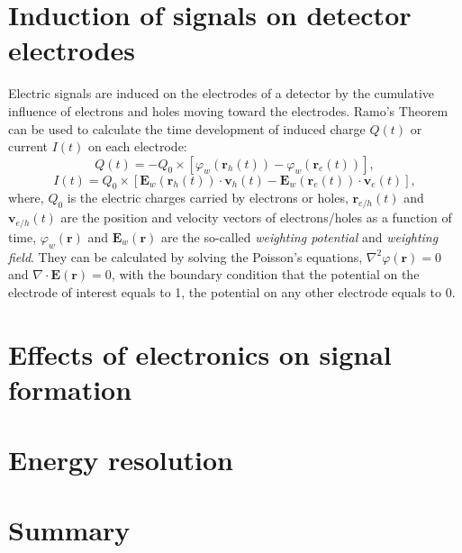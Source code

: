 \section{Induction of signals on detector electrodes}
\label{sec:det:lamo}
Electric signals are induced on the electrodes of a detector by the cumulative influence of electrons and holes moving toward the electrodes. Ramo's Theorem~\cite{Gat82, Rad88, He00} can be used to calculate the time development of induced charge $Q(t)$ or current $I(t)$ on each electrode:
\begin{equation} 
  \label{eq:det:ramoq}
  Q(t) = -Q_{0} \times [\varphi_{w}(\mathbf{r}_{h}(t)) - \varphi_{w}(\mathbf{r}_{e}(t))],
\end{equation}
\begin{equation} 
  \label{eq:det:ramoi}
  I(t) = Q_{0} \times [\mathbf{E}_{w}(\mathbf{r}_{h}(t)) \cdot \mathbf{v}_{h}(t) - \mathbf{E}_{w}(\mathbf{r}_{e}(t)) \cdot \mathbf{v}_{e}(t)],
\end{equation}
where, $Q_{0}$ is the electric charges carried by electrons or holes, $\mathbf{r}_{e/h}(t)$ and $\mathbf{v}_{e/h}(t)$ are the position and velocity vectors of electrons/holes as a function of time, $\varphi_{w}(\mathbf{r})$ and $\mathbf{E}_{w}(\mathbf{r})$ are the so-called \emph{weighting potential} and \emph{weighting field}. They can be calculated by solving the Poisson's equations, $\nabla^{2} \varphi(\mathbf{r}) = 0$ and $\nabla \cdot \mathbf{E}(\mathbf{r}) = 0$, with the boundary condition that the potential on the electrode of interest equals to 1, the potential on any other electrode equals to 0.

\section{Effects of electronics on signal formation}
\label{sec:det:elec}

\section{Energy resolution}
\label{sec:det:temp}

\section{Summary}
\label{sec:det:sum}



